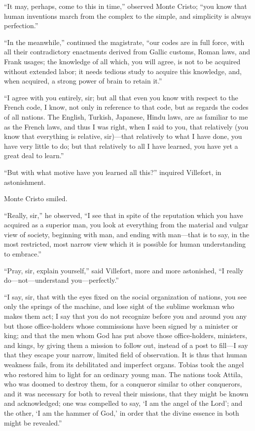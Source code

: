 “It may, perhaps, come to this in time,” observed Monte Cristo; “you
know that human inventions march from the complex to the simple, and
simplicity is always perfection.”

“In the meanwhile,” continued the magistrate, “our codes are in full
force, with all their contradictory enactments derived from Gallic
customs, Roman laws, and Frank usages; the knowledge of all which, you
will agree, is not to be acquired without extended labor; it needs
tedious study to acquire this knowledge, and, when acquired, a strong
power of brain to retain it.”

“I agree with you entirely, sir; but all that even you know with
respect to the French code, I know, not only in reference to that code,
but as regards the codes of all nations. The English, Turkish,
Japanese, Hindu laws, are as familiar to me as the French laws, and
thus I was right, when I said to you, that relatively (you know that
everything is relative, sir)—that relatively to what I have done, you
have very little to do; but that relatively to all I have learned, you
have yet a great deal to learn.”

“But with what motive have you learned all this?” inquired Villefort,
in astonishment.

Monte Cristo smiled.

“Really, sir,” he observed, “I see that in spite of the reputation
which you have acquired as a superior man, you look at everything from
the material and vulgar view of society, beginning with man, and ending
with man—that is to say, in the most restricted, most narrow view which
it is possible for human understanding to embrace.”

“Pray, sir, explain yourself,” said Villefort, more and more
astonished, “I really do—not—understand you—perfectly.”

“I say, sir, that with the eyes fixed on the social organization of
nations, you see only the springs of the machine, and lose sight of the
sublime workman who makes them act; I say that you do not recognize
before you and around you any but those office-holders whose
commissions have been signed by a minister or king; and that the men
whom God has put above those office-holders, ministers, and kings, by
giving them a mission to follow out, instead of a post to fill—I say
that they escape your narrow, limited field of observation. It is thus
that human weakness fails, from its debilitated and imperfect organs.
Tobias took the angel who restored him to light for an ordinary young
man. The nations took Attila, who was doomed to destroy them, for a
conqueror similar to other conquerors, and it was necessary for both to
reveal their missions, that they might be known and acknowledged; one
was compelled to say, ‘I am the angel of the Lord’; and the other, ‘I
am the hammer of God,’ in order that the divine essence in both might
be revealed.”


